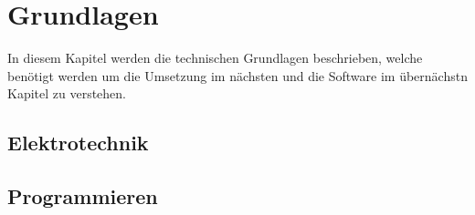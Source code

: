 \section{Grundlagen} \label{sec:grundlagen}
In diesem Kapitel werden die technischen Grundlagen beschrieben, welche benötigt werden um die Umsetzung im nächsten und die Software im übernächstn Kapitel zu verstehen. 



\subsection{Elektrotechnik} \label{subsec:elektrotechnik}



\subsection{Programmieren} \label{subsec:softech}
